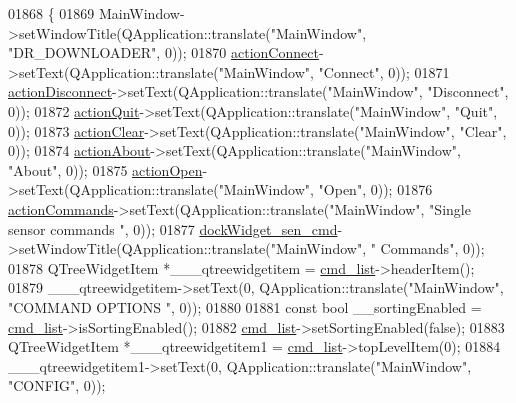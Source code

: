 \begin{DoxyCode}
01868     \{
01869         MainWindow->setWindowTitle(QApplication::translate(\textcolor{stringliteral}{"MainWindow"}, \textcolor{stringliteral}{"DR\_DOWNLOADER"}, 0));
01870         \hyperlink{a00027_aa0785566311fc48271690fb68b1d4c5f}{actionConnect}->setText(QApplication::translate(\textcolor{stringliteral}{"MainWindow"}, \textcolor{stringliteral}{"Connect"}, 0));
01871         \hyperlink{a00027_a8a16b3aef75b279eaaa887152d2f746b}{actionDisconnect}->setText(QApplication::translate(\textcolor{stringliteral}{"MainWindow"}, \textcolor{stringliteral}{"Disconnect"}, 0));
01872         \hyperlink{a00027_a188c243f36a2dbc10e4e2a0ad94273b1}{actionQuit}->setText(QApplication::translate(\textcolor{stringliteral}{"MainWindow"}, \textcolor{stringliteral}{"Quit"}, 0));
01873         \hyperlink{a00027_ac8539dcd87955047877cb256aff60453}{actionClear}->setText(QApplication::translate(\textcolor{stringliteral}{"MainWindow"}, \textcolor{stringliteral}{"Clear"}, 0));
01874         \hyperlink{a00027_abdf2b43167c2cd0d3405f90b8c30e934}{actionAbout}->setText(QApplication::translate(\textcolor{stringliteral}{"MainWindow"}, \textcolor{stringliteral}{"About"}, 0));
01875         \hyperlink{a00027_a5772f39001f62b7f601aafe72caa10c0}{actionOpen}->setText(QApplication::translate(\textcolor{stringliteral}{"MainWindow"}, \textcolor{stringliteral}{"Open"}, 0));
01876         \hyperlink{a00027_a3dccdc21d3df68b86550093b5e3c0356}{actionCommands}->setText(QApplication::translate(\textcolor{stringliteral}{"MainWindow"}, \textcolor{stringliteral}{"Single sensor commands
       "}, 0));
01877         \hyperlink{a00027_a9eb86a5ee396766f0f4a65f2d2bd7688}{dockWidget\_sen\_cmd}->setWindowTitle(QApplication::translate(\textcolor{stringliteral}{"MainWindow"}, \textcolor{stringliteral}{"
      Commands"}, 0));
01878         QTreeWidgetItem *\_\_\_qtreewidgetitem = \hyperlink{a00027_aa66ece71395b435e915d384fb63bac1d}{cmd\_list}->headerItem();
01879         \_\_\_qtreewidgetitem->setText(0, QApplication::translate(\textcolor{stringliteral}{"MainWindow"}, \textcolor{stringliteral}{"COMMAND OPTIONS  "}, 0));
01880 
01881         \textcolor{keyword}{const} \textcolor{keywordtype}{bool} \_\_sortingEnabled = \hyperlink{a00027_aa66ece71395b435e915d384fb63bac1d}{cmd\_list}->isSortingEnabled();
01882         \hyperlink{a00027_aa66ece71395b435e915d384fb63bac1d}{cmd\_list}->setSortingEnabled(\textcolor{keyword}{false});
01883         QTreeWidgetItem *\_\_\_qtreewidgetitem1 = \hyperlink{a00027_aa66ece71395b435e915d384fb63bac1d}{cmd\_list}->topLevelItem(0);
01884         \_\_\_qtreewidgetitem1->setText(0, QApplication::translate(\textcolor{stringliteral}{"MainWindow"}, \textcolor{stringliteral}{"CONFIG"}, 0));

\end{DoxyCode}
